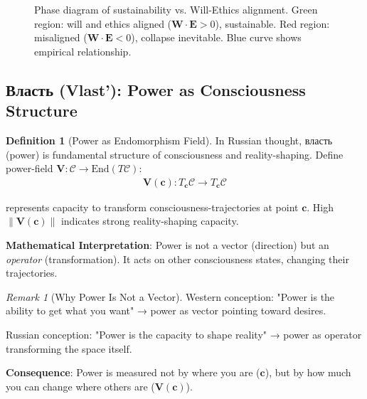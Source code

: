 \documentclass[11pt,a4paper]{article}
\theoremstyle{definition}
\newtheorem{definition}{Definition}[section]
\theoremstyle{remark}
\newtheorem{remark}{Remark}[section]
\newcommand{\CC}{\mathcal{C}}
\newcommand{\EE}{\mathbf{E}}
\newcommand{\WW}{\mathbf{W}}
\newcommand{\VV}{\mathbf{V}}
\newcommand{\cc}{\mathbf{c}}
\newcommand{\norm}[1]{\left\|#1\right\|}
\begin{document}
\begin{small}
\begin{enumerate}
\begin{figure}[H]
\caption{Phase diagram of sustainability vs. Will-Ethics alignment. Green region: will and ethics aligned (\(\WW \cdot \EE > 0\)), sustainable. Red region: misaligned (\(\WW \cdot \EE < 0\)), collapse inevitable. Blue curve shows empirical relationship.}
\label{fig:will_ethics_phase}
\end{figure}

\subsection{Власть (Vlast'): Power as Consciousness Structure}

\begin{definition}[Power as Endomorphism Field]
In Russian thought, власть (power) is fundamental structure of consciousness and reality-shaping. Define power-field \(\VV: \CC \to \text{End}(T\CC)\):
\begin{align}
\VV(\cc): T_{\cc}\CC \to T_{\cc}\CC
\end{align}

represents capacity to transform consciousness-trajectories at point \(\cc\). High \(\norm{\VV(\cc)}\) indicates strong reality-shaping capacity.

\textbf{Mathematical Interpretation}: Power is not a vector (direction) but an \textit{operator} (transformation). It acts on other consciousness states, changing their trajectories.
\end{definition}

\begin{remark}[Why Power Is Not a Vector]
Western conception: "Power is the ability to get what you want" → power as vector pointing toward desires.

Russian conception: "Power is the capacity to shape reality" → power as operator transforming the space itself.

\textbf{Consequence}: Power is measured not by where you are (\(\cc\)), but by how much you can change where others are (\(\VV(\cc)\)).
\end{remark}


\end{enumerate}
\end{small}
\end{document}

